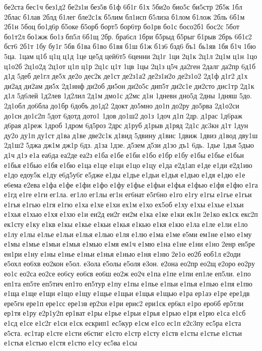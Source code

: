 {бе2ста
бес1ч
без1д2
бе2з1и
без5в
б1ф
6б1г
б1х
5би2о
био5с
би5стр
2б5к
1бл
2блас
б1лав
2блд
б1лег
бле2с1к
б5лим
бл1исп
б5лиза
б1лом
б1лож
2бль
6б1м
2б1н
5боц
бо1д6р
б5оке
б5орб
борт5
бор6тр
бо1рв
бо1с
босо2б1
бос2с
5бот
бо1т2л
бо1жж
бо1з
бп5л
6б1щ
2бр.
бра6сл
1бри
б5рыд
б5рыг
б1рыв
2брь
6б1с2
бст6
2б1т
1бу
бу1г
5бв
б1ва
б1во
б1вя
б1ш
б1ж
б1з6
бзд6
бъ1
бь1яв
1бя
б1ч
1бю
5ца.
1цам
ц1б
ц1ц
ц1д
1це
це5д
цей6т5
6ценни
2ц1г
1ци
2ц1к
2ц1л
2ц1м
ц1н
1цо
ц1о2б
2ц1о2д
2ц1от
ц1п
ц1р
2ц1с
ц1т
1цв
1цы
2ц1з
ц5ч
да2ген
2далг
да2пр
6д1б
д1д
5деб
де1гл
де5х
де2о
дес2к
де1ст
де2з1а2
де2з1и2о
де2з1о2
2д1ф
д1г2
д1х
ди2ад
ди2ам
ди5х
2д1инф
ди2об
ди5он
ди2о5с
дип5т
ди2с1е
ди2сто
дис1тр
2д1к
д1л
5д6лей
1д2лев
1д2лил
2д1м
дмо1с
д2мс
д1н
1дневн
дно5д
2дны
1дняш
5до.
2д1обл
до6бла
до1бр
6добъ
до1д2
2докт
до5мно
до1п
до2ру
до5рва
2д1о2си
до1сн
до1с2п
5дот
6дотд
дото1
1дов
до1ш2
до1з
1доч
д1п
2др.
д1рас
1д6раж
д6рая
д1реж
1дроб
1дром
6д5роз
2дрс
д1руб
д1рыв
д1ряд
2д1с
дс3кн
д1т
1дун
ду2о
ду1п
ду1ст
д1ва
д1ве
две2с1к
д1вид
5двину
д1вис
1движ
1двиз
д1вод
дву1ш
2д1ш2
5джа
дж1м
дж1р
6дз.
д1за
1дзе.
д5зем
д5зи
д1зо
дъ1
6дь.
1дье
1дья
5дью
д1ч
д1э
е1а
еа6да
еа2де
еа2з
е1ба
е1бе
е1би
е1бо
е1бр
е1бу
е1бы
е1бье
е1бьи
е1бья
е1бью
е1бя
е1бю
е1ца
е1це
е1ци
е1цо
е1цу
е1да
е2д1ап
е1де
е1ди
е2д1ию
е1до
едоу5к
е1ду
е6д5у6г
е5дже
е1ды
е1дье
е1дьи
е1дья
е1дью
е1дя
е1дю
е1е
е6ема
е2ева
е1фа
е1фе
е1фи
е1фо
е1фу
е1фье
е1фьи
е1фья
е1фью
е1фя
е1фю
е1га
е1гд
е1ге
е1ги
ег1ла.
ег1ло
ег1лы
ег1н
ег6нат
е5г6но
е1го
е1гу
е1гы
е1гье
е1гьи
е1гья
е1гью
е1гя
е1гю
е1ха
е1хе
е1хи
ех1м
е1хо
ех5об
е1ху
е1хы
е1хье
е1хьи
е1хья
е1хью
е1хя
е1хю
е1и
еи2д
еи2г
еи2м
е1ка
е1ке
е1ки
ек1н
2е1ко
ек1ск
екс2п
ек1сту
е1ку
е1кв
е1кы
е1кье
е1кьи
е1кья
е1кью
е1кя
е1кю
е1ла
е1ле
е1ли
е1ло
е1лу
е1лы
е1лье
е1льи
е1лья
е1лью
е1ля
е1лю
е1ма
е1ме
е5ми
ем1не
е1мо
е1му
е1мы
е1мье
е1мьи
е1мья
е1мью
е1мя
ем1ч
е1мю
е1на
е1не
е1ни
е1но
2енр
ен5ре
ен1ри
е1ну
е1ны
е1нье
е1ньи
е1нья
е1нью
е1ня
е1ню
2е1о
ео2б
еоб1л
е2оди
е5охл
ео6хв
ео2кон
е5ол.
е3ола
е5олы
е5оля
е3он.
е2она
ео2пр
ео2щ
е2оро
ео2ру
ео1с
ео2са
ео2се
ео6су
ео6св
ео6ш
ео2ж
ео2ч
е1па
е1пе
е1пи
еп1ле
еп5ли.
е1по
еп1та
еп5те
еп5тич
еп1то
еп5тур
е1пу
е1пы
е1пье
е1пьи
е1пья
е1пью
е1пя
е1пю
е1ща
е1ще
е1щи
е1що
е1щу
е1щье
е1щьи
е1щья
е1щью
е1ра
ер1аэ
е1ре
ере1дв
ере5гн
ере1п
ере1сс
ере1зв
ер2хи
е1ри
ерис2
ери1ск
ер6кл
е1ро
еро6б
ер5тли
ер1тя
е1ру
е2р1у2п
ер1ват
е1ры
е1рье
е1рьи
е1рья
е1рью
е1ря
е1рю
е1са
е1сб
е1сд
е1се
е1с2г
е1си
е1ск
ескрип1
ес5кур
е1см
е1со
ес1п
е2с3пу
ес5ра
е1ста
е5ста.
ес1тар
е1сте
е1сти
е6стиг
е1сто
е1стр
е1сту
е1ств
е1сты
е1стье
е1стьи
е1стья
е1стью
е1стя
е1стю
е1су
ес5ва
е1сы
}
